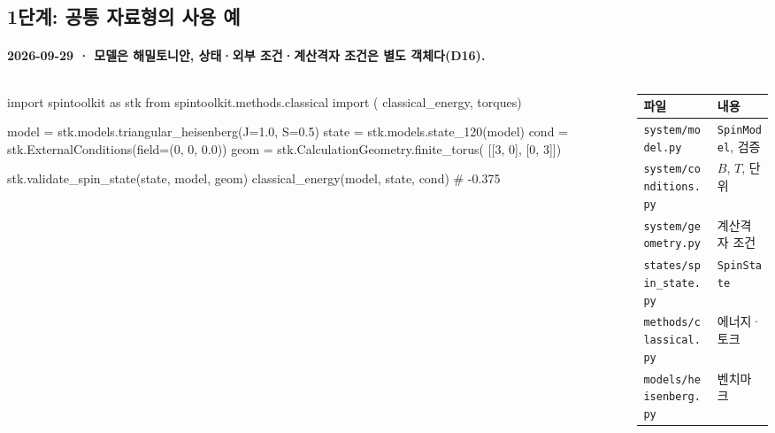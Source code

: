 \subsection{1단계: 공통 자료형의 사용 예}\label{stage1-api}
\begingroup%
  \framesubtitle{2026-09-29 · 모델은 해밀토니안, 상태·외부 조건·계산격자 조건은 별도 객체다(D16).}
  \begin{columns}[T,onlytextwidth]
    \begin{column}{0.56\textwidth}
\begin{semiverbatim}\scriptsize
import spintoolkit as stk
from spintoolkit.methods.classical import (
    classical_energy, torques)

model = stk.models.triangular_heisenberg(J=1.0, S=0.5)
state = stk.models.state_120(model)
cond  = stk.ExternalConditions(field=(0, 0, 0.0))
geom  = stk.CalculationGeometry.finite_torus(
            [[3, 0], [0, 3]])

stk.validate_spin_state(state, model, geom)
classical_energy(model, state, cond)  # -0.375
\end{semiverbatim}
    \end{column}
    \begin{column}{0.40\textwidth}
      \small
      \begin{tabular}{@{}ll@{}}
        \toprule
        파일 & 내용 \\
        \midrule
        \texttt{system/model.py} & \texttt{SpinModel}, 검증 \\
        \texttt{system/conditions.py} & $B$, $T$, 단위 \\
        \texttt{system/geometry.py} & 계산격자 조건 \\
        \texttt{states/spin\_state.py} & \texttt{SpinState} \\
        \texttt{methods/classical.py} & 에너지·토크 \\
        \texttt{models/heisenberg.py} & 벤치마크 \\
        \bottomrule
      \end{tabular}
    \end{column}
  \end{columns}
  \par\medskip
\endgroup


